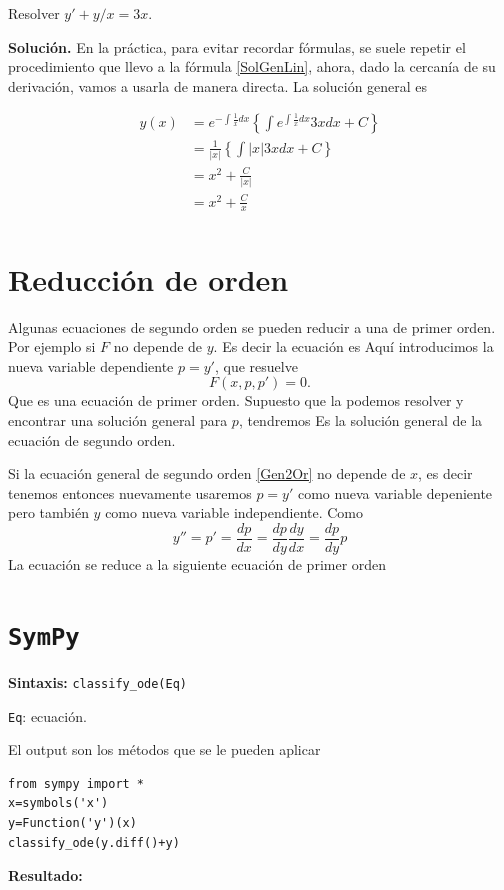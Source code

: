 \begin{ejemplo} Resolver $y'+y/x=3x$.
 \end{ejemplo}


\noindent\textbf{Solución.} En la práctica, para evitar recordar fórmulas, se suele repetir el procedimiento que llevo a la fórmula \eqref{SolGenLin}, ahora, dado la cercanía
de su derivación, vamos a usarla  de manera directa. La solución general es

\[\begin{split} y(x)&=e^{-\int\frac{1}{x}dx}\left\{\int e^{\int\frac{1}{x}dx}3xdx+C\right\}\\
   &=\frac{1}{|x|}\left\{\int |x| 3xdx+C\right\}\\
   &=x^2+\frac{C}{|x|}\\
   &=x^2+\frac{C}{x}\\
  \end{split}
\]




\section{Reducción de orden}

Algunas ecuaciones de segundo orden
se pueden reducir a una de primer orden. Por ejemplo si $F$ no depende de $y$. Es decir la ecuación es
Aquí introducimos la nueva variable dependiente $\boxed{p=y'}$, que resuelve
\[F(x,p,p')=0.\]
Que es una ecuación de primer orden. Supuesto que la podemos resolver y encontrar una solución general para  $p$, tendremos
Es la solución general de la ecuación de segundo orden.


Si la ecuación general de segundo orden \eqref{Gen2Or} no depende de $x$, es decir tenemos
entonces nuevamente usaremos $\boxed{p=y'}$ como nueva variable depeniente
pero también  $\boxed{y}$ como nueva variable independiente. Como
\[y''=p'=\frac{dp}{dx}=\frac{dp}{dy}\frac{dy}{dx}=\frac{dp}{dy}p\]
La ecuación se reduce a la siguiente ecuación de primer orden



\section{\texttt{SymPy}}



\begin{codigo}
\textbf{Sintaxis:} \verb+classify_ode(Eq)+

\verb+Eq+:  ecuación.

\end{codigo}
El output son los métodos que se le pueden aplicar
\begin{lstlisting}
from sympy import *
x=symbols('x')
y=Function('y')(x)
classify_ode(y.diff()+y)
\end{lstlisting}
\noindent\textbf{Resultado:}

